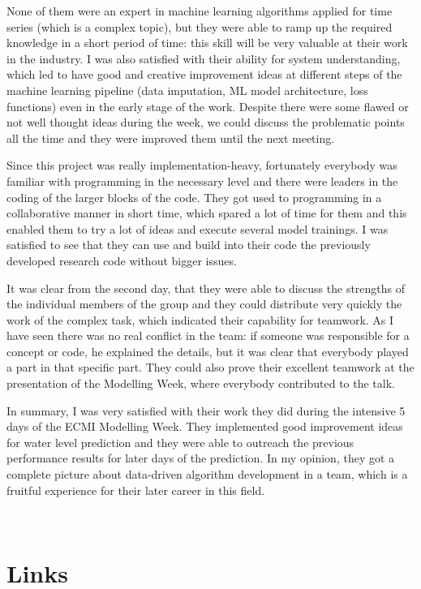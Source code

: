 \documentclass{article}
\begin{document}
None of them were an expert in machine learning algorithms applied for time series (which is a complex topic), but they were able to ramp up the required knowledge in a short period of time: this skill will be very valuable at their work in the industry. I was also satisfied with their ability for system understanding, which led to have good and creative improvement ideas at different steps of the machine learning pipeline (data imputation, ML model architecture, loss functions) even in the early stage of the work. Despite there were some flawed or not well thought ideas during the week, we could discuss the problematic points all the time and they were improved them until the next meeting.

Since this project was really implementation-heavy, fortunately everybody was familiar with programming in the necessary level and there were leaders in the coding of the larger blocks of the code. They got used to programming in a collaborative manner in short time, which spared a lot of time for them and this enabled them to try a lot of ideas and execute several model trainings. I was satisfied to see that they can use and build into their code the previously developed research code without bigger issues.

It was clear from the second day, that they were able to discuss the strengths of the individual members of the group and they could distribute very quickly the work of the complex task, which indicated their capability for teamwork. As I have seen there was no real conflict in the team: if someone was responsible for a concept or code, he explained the details, but it was clear that everybody played a part in that specific part. They could also prove their excellent teamwork at the presentation of the Modelling Week, where everybody contributed to the talk.

In summary, I was very satisfied with their work they did during the intensive 5 days of the ECMI Modelling Week. They implemented good improvement ideas for water level prediction and they were able to outreach the previous performance results for later days of the prediction. In my opinion, they got a complete picture about data-driven algorithm development in a team, which is a fruitful experience for their later career in this field.

\

\section{Links}
\end{document}
